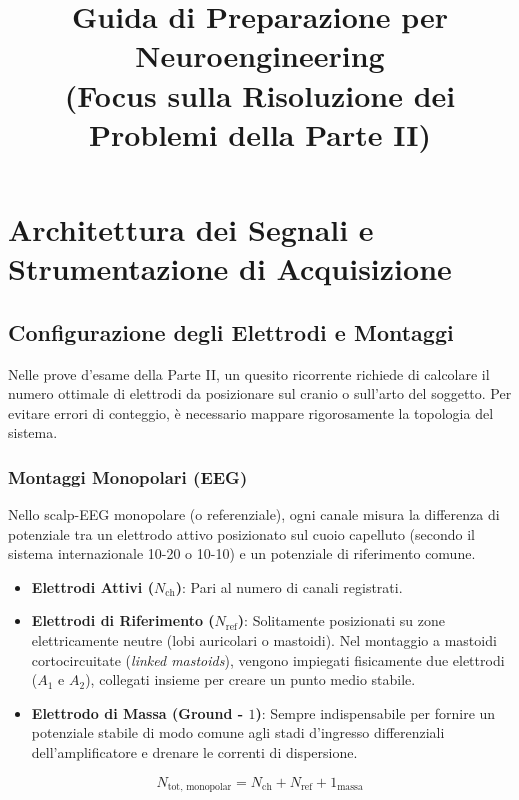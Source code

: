 \documentclass[10pt, letterpaper]{report}
\title{Guida di Preparazione per Neuroengineering\\(Focus sulla Risoluzione dei Problemi della Parte II)}
\date{}
\begin{document}
\maketitle
\tableofcontents
\newpage

\chapter{Architettura dei Segnali e Strumentazione di Acquisizione}

\section{Configurazione degli Elettrodi e Montaggi}
Nelle prove d'esame della Parte II, un quesito ricorrente richiede di calcolare il numero ottimale di elettrodi da posizionare sul cranio o sull'arto del soggetto.
Per evitare errori di conteggio, è necessario mappare rigorosamente la topologia del sistema.

\subsection{Montaggi Monopolari (EEG)}
Nello scalp-EEG monopolare (o referenziale), ogni canale misura la differenza di potenziale tra un elettrodo attivo posizionato sul cuoio capelluto (secondo il sistema internazionale 10-20 o 10-10) e un potenziale di riferimento comune.
\begin{itemize}
    \item \textbf{Elettrodi Attivi ($N_{\text{ch}}$)}: Pari al numero di canali registrati.
    \item \textbf{Elettrodi di Riferimento ($N_{\text{ref}}$)}: Solitamente posizionati su zone elettricamente neutre (lobi auricolari o mastoidi).
    Nel montaggio a mastoidi cortocircuitate (\emph{linked mastoids}), vengono impiegati fisicamente due elettrodi ($A_1$ e $A_2$), collegati insieme per creare un punto medio stabile.
    \item \textbf{Elettrodo di Massa (Ground - $1$)}: Sempre indispensabile per fornire un potenziale stabile di modo comune agli stadi d'ingresso differenziali dell'amplificatore e drenare le correnti di dispersione.
\end{itemize}
\[
N_{\text{tot, monopolar}} = N_{\text{ch}} + N_{\text{ref}} + 1_{\text{massa}}
\]
\end{document}
